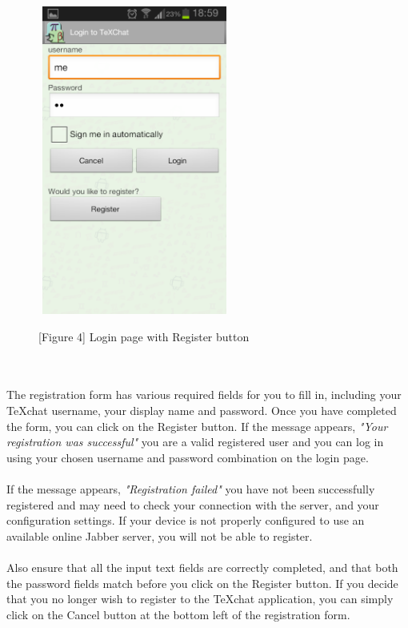 \documentclass[29pt,a4paper]{moderncv}
\begin{document}
		\noindent\begin{figure}
		\centering
		\includegraphics[width=2.5in, height=4.0in]{./Screenshot_2013-10-23-18-59-04.png} \\
		\centering \caption{[Figure 4] Login page with Register button}
		\end{figure}\\
		
		\\The registration form has various required fields for you to fill in, including your TeXchat username, your display name and password.  Once you have completed the form, you can click on the Register button.  If the message appears, \textit{"Your registration was successful"} you are a valid registered user and you can log in using your chosen username and password combination on the login page. \\
		
		\\If the message appears, \textit{"Registration failed"} you have not been successfully registered and may need to check your connection with the server, and your configuration settings.  If your device is not properly configured to use an available online Jabber server, you will not be able to register.\\
		
		\\Also ensure that all the input text fields are correctly completed, and that both the password fields match before you click on the Register button.  If you decide that you no longer wish to register to the TeXchat application, you can simply click on the Cancel button at the bottom left of the registration form.\\
		
\end{document}
